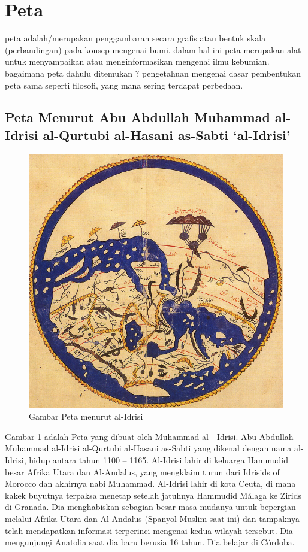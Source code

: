 
\section{Peta}
	peta adalah/merupakan penggambaran secara grafis atau bentuk skala (perbandingan) pada konsep mengenai bumi. dalam hal ini peta merupakan alat untuk menyampaikan atau menginformasikan mengenai ilmu kebumian. bagaimana peta dahulu ditemukan ? pengetahuan mengenai dasar pembentukan peta sama seperti filosofi, yang mana sering terdapat perbedaan.

\subsection{Peta Menurut Abu Abdullah Muhammad al-Idrisi al-Qurtubi al-Hasani as-Sabti `al-Idrisi'}
	\begin{figure} [ht]
	\centerline{\includegraphics[width=1\textwidth]{figures/1.jpg}}
	\caption{Gambar Peta menurut al-Idrisi}
	\label{Petaal-Idrisi}
	\end{figure}
	Gambar \ref{Petaal-Idrisi} adalah Peta yang dibuat oleh Muhammad al - Idrisi.
	Abu Abdullah Muhammad al-Idrisi al-Qurtubi al-Hasani as-Sabti yang dikenal dengan nama al-Idrisi, hidup antara tahun 1100 – 1165. Al-Idrisi lahir di keluarga Hammudid besar Afrika Utara dan Al-Andalus, yang mengklaim turun dari Idrisids of Morocco dan akhirnya nabi Muhammad. Al-Idrisi lahir di kota Ceuta, di mana kakek buyutnya terpaksa menetap setelah jatuhnya Hammudid Málaga ke Zirids di Granada. Dia menghabiskan sebagian besar masa mudanya untuk bepergian melalui Afrika Utara dan Al-Andalus (Spanyol Muslim saat ini) dan tampaknya telah mendapatkan informasi terperinci mengenai kedua wilayah tersebut. Dia mengunjungi Anatolia saat dia baru berusia 16 tahun. Dia belajar di Córdoba.
